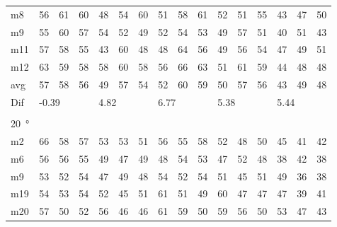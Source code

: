 \begin{table}[H]
\begin{tabular}{l|l|l|l|l|l|l|l|l|l|l|l|l|lll}
m8    & 56     &  61    & 60     & 48     &  54    & 60     & 51     & 58      &    61  &    52   &   51   &   55   & \multicolumn{1}{l|}{43} & \multicolumn{1}{l|}{47} & 50 \\ 
m9    &  55    & 60     &  57    & 54     &   52   &  49    & 52     &  54     &   53   &     49  &    57  &   51   & \multicolumn{1}{l|}{40} & \multicolumn{1}{l|}{51} & 43 \\ 
m11  &  57    & 58     &  55    &  43    &   60   &  48    & 48     &   64    &    56  &     49  &    56  &    54  & \multicolumn{1}{l|}{47} & \multicolumn{1}{l|}{49} & 51 \\ 
m12  &  63    & 59     &  58    &  58    &  60    & 58     & 56     &   66    &    63  &    51   &    61  &  59    & \multicolumn{1}{l|}{44} & \multicolumn{1}{l|}{48} & 48 \\ \hline
avg &  57    & 58     &  56    &   49   &  57    & 54     &  52    &  60     & 59     &   50    &  57    &  56    & \multicolumn{1}{l|}{43} & \multicolumn{1}{l|}{49}  & 48  \\ \hline  
Dif & \multicolumn{3}{l|}{-0.39} & \multicolumn{3}{l|}{4.82} & \multicolumn{3}{l|}{6.77} & \multicolumn{3}{l|}{5.38} & \multicolumn{3}{l}{5.44}  \\ 
 \multicolumn{16}{l}{ } \\                             
\SI{20}{\degree}   & \multicolumn{3}{l|}{} & \multicolumn{3}{l|}{} & \multicolumn{3}{l|}{} & \multicolumn{3}{l|}{} & \multicolumn{3}{l}{}   \\  \hline
m2    & 66     &  58    &  57    &  53    &  53    &  51    &  56    &   55    &  58    &  52     &  48    &  50    & \multicolumn{1}{l|}{45} & \multicolumn{1}{l|}{41} & 42  \\
m6    & 56     &  56    &  55    & 49     &  47    &  49    &   48   &   54    &   53   &   47    &  52    &  48    & \multicolumn{1}{l|}{38} & \multicolumn{1}{l|}{42} & 38  \\
m9    &  53    &  52    & 54     &  47    &   49   &   48   &   54   &   52    &  54    &   51    &  45   &  51    & \multicolumn{1}{l|}{49} & \multicolumn{1}{l|}{36} & 38 \\
m19  &    54  &  53    &  54    &  52    &  45    &    51  &   61   &   51    &   49   &   60    &  47   &   47   & \multicolumn{1}{l|}{47} & \multicolumn{1}{l|}{39} & 41 \\
m20  & 57     &  50    &  52    &  56    &  46    &    46  &   61   &   59    &   50   &  59     &  56    &   50   & \multicolumn{1}{l|}{53} & \multicolumn{1}{l|}{47} &  43\\ \hline

\end{tabular}
\end{table}
